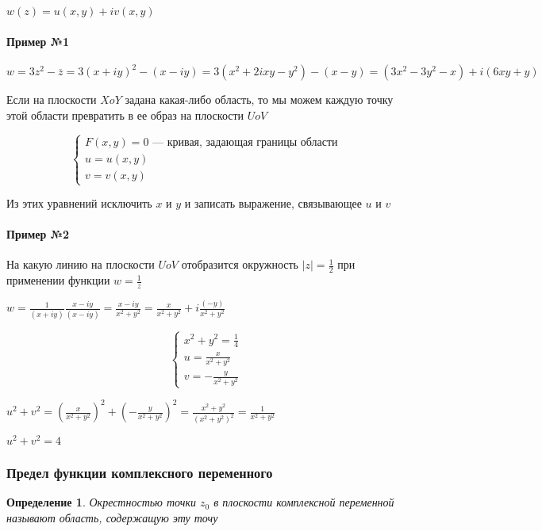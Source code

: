 \documentclass{article}
\newtheorem{definition}{Определение}
\begin{document}
$w(z) = u(x, y) + i v (x, y)$

\paragraph{Пример №1}

$w = 3 z^2 - \overline{z} = 3 (x + i y)^2 - (x - i y) = 3 (x^2 + 2 i x y - y^2) - (x - y) = (3x^2 - 3y^2 - x) + i (6 x y + y)$

\hfill

Если на плоскости $X o Y$ задана какая-либо область, то мы можем каждую точку этой области превратить в ее образ на плоскости $U o V$

$$
\begin{cases}
F(x, y) = 0 \text{ — кривая, задающая границы области} \\
u = u(x, y) \\ 
v = v(x, y)
\end{cases}
$$

Из этих уравнений исключить $x$ и $y$ и записать выражение, связывающее $u$ и $v$

\hfill

\paragraph{Пример №2}

На какую линию на плоскости $U o V$ отобразится окружность $|z| = \frac{1}{2}$ при применении функции $w = \frac{1}{z}$

$w = \frac{1}{(x + i y)} \frac{x - i y}{(x - i y)} = \frac{x - i y}{x^2 + y^2} = \frac{x}{x^2 + y^2} + i \frac{(- y)}{x^2 + y^2}$

$$
\begin{cases}
    x^2 + y^2 = \frac{1}{4} \\
    u = \frac{x}{x^2 + y^2} \\
    v = -\frac{y}{x^2 + y^2}
\end{cases}
$$

$u^2 + v^2 = (\frac{x}{x^2 + y^2})^2 + (-\frac{y}{x^2 + y^2})^2 = \frac{x^2 + y^2}{(x^2 + y^2)^2} = \frac{1}{x^2 + y^2}$

$u^2 + v^2 = 4$

\subsubsection{Предел функции комплексного переменного}

\begin{definition}
    Окрестностью точки $z_0$ в плоскости комплексной переменной называют область, содержащую эту точу
\end{definition}
\end{document}
